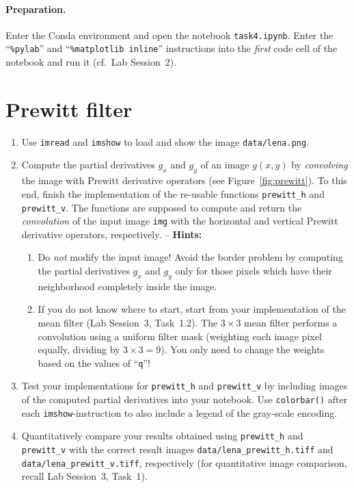\documentclass[12pt,a4paper]{article}
\begin{document}
\paragraph{Preparation.} Enter the Conda environment and open the notebook \texttt{task4.ipynb}. Enter the ``\texttt{\%pylab}'' and ``\texttt{\%matplotlib inline}'' instructions into the \emph{first} code cell of the notebook and run it (cf.\ Lab Session~2).

\section{Prewitt filter}
\label{task:prewitt}
\begin{enumerate}
    \item Use \texttt{imread} and \texttt{imshow} to load and show the image \texttt{data/lena.png}.
    \item Compute the partial derivatives $g_x$ and $g_y$ of an image $g\left(x,y\right)$ by \emph{convolving} the image with Prewitt derivative operators (see Figure~\ref{fig:prewitt}). To this end, finish the implementation of the re-usable functions \texttt{prewitt\_h} and \texttt{prewitt\_v}. The functions are supposed to compute and return the \emph{convolution} of the input image \texttt{img} with the horizontal and vertical Prewitt derivative operators, respectively. -- \textbf{Hints:}
    \begin{enumerate}
        \item Do \emph{not} modify the input image! Avoid the border problem by computing the partial derivatives $g_x$ and $g_y$ only for those pixels which have their neighborhood completely inside the image.
        \item If you do not know where to start, start from your implementation of the mean filter (Lab Session~3, Task~1.2). The $3 \times 3$ mean filter performs a convolution using a uniform filter mask (weighting each image pixel equally, dividing by $3 \times 3 = 9$). You only need to change the weights based on the values of ``\texttt{q}''!
    \end{enumerate}
    \item Test your implementations for \texttt{prewitt\_h} and \texttt{prewitt\_v} by including images of the computed partial derivatives into your notebook. Use \texttt{colorbar()} after each \texttt{imshow}-instruction to also include a legend of the gray-scale encoding.
    \item Quantitatively compare your results obtained using \texttt{prewitt\_h} and \texttt{prewitt\_v} with the correct result images \texttt{data/lena\_prewitt\_h.tiff} and \texttt{data/lena\_\-prewitt\_\-v.tiff}, respectively (for quantitative image comparison, recall Lab Session~3, Task~1).
\end{enumerate}
\end{document}
